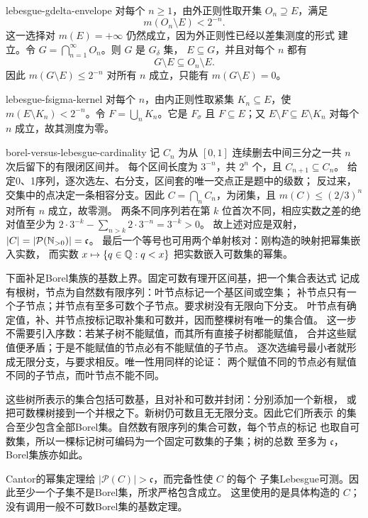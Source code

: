 \begin{solution}{lebesgue-gdelta-envelope}
对每个 $n\ge1$，由外正则性取开集 $O_n\supseteq E$，满足
\[
 m(O_n\setminus E)<2^{-n}.
\]
这一选择对 $m(E)=+\infty$ 仍然成立，因为外正则性已经以差集测度的形式
建立。令 $G=\bigcap_{n=1}^{\infty}O_n$。则 $G$ 是 $G_\delta$ 集，
$E\subseteq G$，并且对每个 $n$ 都有
\[
 G\setminus E\subseteq O_n\setminus E.
\]
因此 $m(G\setminus E)\le2^{-n}$ 对所有 $n$ 成立，只能有
$m(G\setminus E)=0$。
\end{solution}

\begin{solution}{lebesgue-fsigma-kernel}
对每个 $n$，由内正则性取紧集 $K_n\subseteq E$，使
$m(E\setminus K_n)<2^{-n}$。令 $F=\bigcup_nK_n$。它是 $F_\sigma$ 且
$F\subseteq E$；又 $E\setminus F\subseteq E\setminus K_n$ 对每个 $n$
成立，故其测度为零。
\end{solution}

\begin{solution}{borel-versus-lebesgue-cardinality}
记 $C_n$ 为从 $[0,1]$ 连续删去中间三分之一共 $n$ 次后留下的有限闭区间并。
每个区间长度为 $3^{-n}$，共 $2^n$ 个，且 $C_{n+1}\subseteq C_n$。
给定0、1序列，逐次选左、右分支，区间套的唯一交点正是题中的级数；
反过来，交集中的点决定一条相容分支。因此 $C=\bigcap_nC_n$，为闭集，且
$m(C)\le(2/3)^n$ 对所有 $n$ 成立，故零测。
两条不同序列若在第 $k$ 位首次不同，相应实数之差的绝对值至少为
$2\cdot3^{-k}-\sum_{n>k}2\cdot3^{-n}=3^{-k}>0$。
故上述对应是双射，$|C|=|\mathcal P(\mathbb{N}_{>0})|=\mathfrak c$。
最后一个等号也可用两个单射核对：刚构造的映射把幂集嵌入实数，
而实数 $x\mapsto\{q\in\mathbb{Q}:q<x\}$ 把实数嵌入可数集的幂集。

下面补足Borel集族的基数上界。固定可数有理开区间基，把一个集合表达式
记成有根树，节点为自然数有限序列：叶节点标记一个基区间或空集；
补节点只有一个子节点；并节点有至多可数个子节点。要求树没有无限向下分支。
叶节点有确定值，补、并节点按标记取补集和可数并，因而整棵树有唯一的集合值。
这一步不需要引入序数：若某子树不能赋值，而其所有直接子树都能赋值，
合并这些赋值便矛盾；于是不能赋值的节点必有不能赋值的子节点。
逐次选编号最小者就形成无限分支，与要求相反。唯一性用同样的论证：
两个赋值不同的节点必有赋值不同的子节点，而叶节点不能不同。

这些树所表示的集合包括可数基，且对补和可数并封闭：分别添加一个新根，
或把可数棵树接到一个并根之下。新树仍可数且无无限分支。因此它们所表示
的集合至少包含全部Borel集。自然数有限序列的集合可数，每个节点的标记
也取自可数集，所以一棵标记树可编码为一个固定可数集的子集；树的总数
至多为 $\mathfrak c$，Borel集族亦如此。

Cantor的幂集定理给 $|\mathcal P(C)|>\mathfrak c$，而完备性使 $C$ 的每个
子集Lebesgue可测。因此至少一个子集不是Borel集，所求严格包含成立。
这里使用的是具体构造的 $C$；没有调用一般不可数Borel集的基数定理。
\end{solution}

